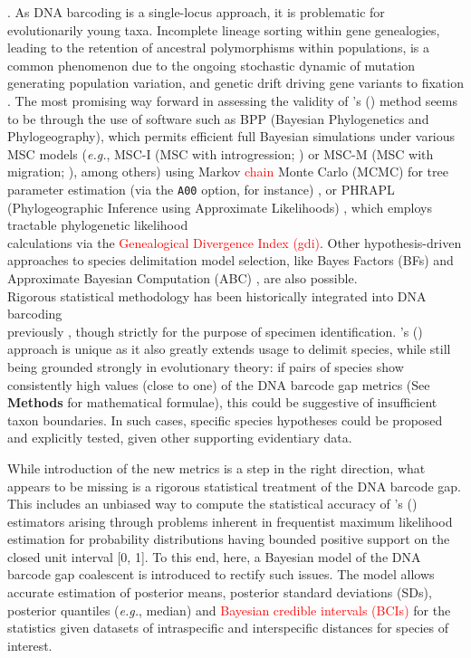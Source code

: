 \documentclass[12pt]{article}
\begin{document}
\citep{hickerson2006dna, carstens2013how, rannala2015art}. As DNA barcoding is a single-locus approach, it is problematic for evolutionarily young taxa. Incomplete lineage sorting within gene genealogies, leading to the retention of ancestral polymorphisms within populations, is a common phenomenon due to the ongoing stochastic dynamic of mutation generating population variation, and genetic drift driving gene variants to fixation \citep{degnan2009gene, rannala2015art}. The most promising way forward in assessing the validity of \citeauthor{phillips2024measure}'s (\citeyear{phillips2024measure}) method seems to be through the use of software such as BPP (Bayesian Phylogenetics and Phylogeography), which permits efficient full Bayesian simulations under various MSC models (\textit{e.g.}, MSC-I (MSC with introgression; \citet{flouri2020bayesian}) or MSC-M (MSC with migration; \citet{flouri2023efficient}), among others) using Markov \textcolor{red}{chain} Monte Carlo (MCMC) for tree parameter estimation (via the {\tt A00} option, for instance) \citep{flouri2018species}, or PHRAPL (Phylogeographic Inference using Approximate Likelihoods) \citep{jackson2017species, jackson2017phrapl}, which employs tractable phylogenetic likelihood \\ calculations via the \textcolor{red}{Genealogical Divergence Index (gdi)}. Other hypothesis-driven approaches to species delimitation model selection, like Bayes Factors (BFs) \citep{leache2014species} and Approximate Bayesian Computation (ABC) \citep{camargo2012species}, are also possible. \\ Rigorous statistical methodology has been historically integrated into DNA barcoding \\ previously \citep{matz2005likelihood, nielsen2006statistical}, though strictly for the purpose of specimen identification. \citeauthor{phillips2024measure}'s (\citeyear{phillips2024measure}) approach is unique as it also greatly extends usage to delimit species, while still being grounded strongly in evolutionary theory: if pairs of species show consistently high values (close to one) of the DNA barcode gap metrics (See \textbf{Methods} for mathematical formulae), this could be suggestive of insufficient taxon boundaries. In such cases, specific species hypotheses could be proposed and explicitly tested, given other supporting evidentiary data. 

While introduction of the new metrics is a step in the right direction, what appears to be missing is a rigorous statistical treatment of the DNA barcode gap. This includes an unbiased way to compute the statistical accuracy of \citeauthor{phillips2024measure}'s (\citeyear{phillips2024measure}) estimators arising through problems inherent in frequentist maximum likelihood estimation for probability distributions having bounded positive support on the closed unit interval [0, 1]. To this end, here, a Bayesian model of the DNA barcode gap coalescent is introduced to rectify such issues. The model allows accurate estimation of posterior means, posterior standard deviations (SDs), posterior quantiles (\textit{e.g.}, median) and \textcolor{red}{Bayesian credible intervals (BCIs)} for the statistics given datasets of intraspecific and interspecific distances for species of interest.
\end{document}
